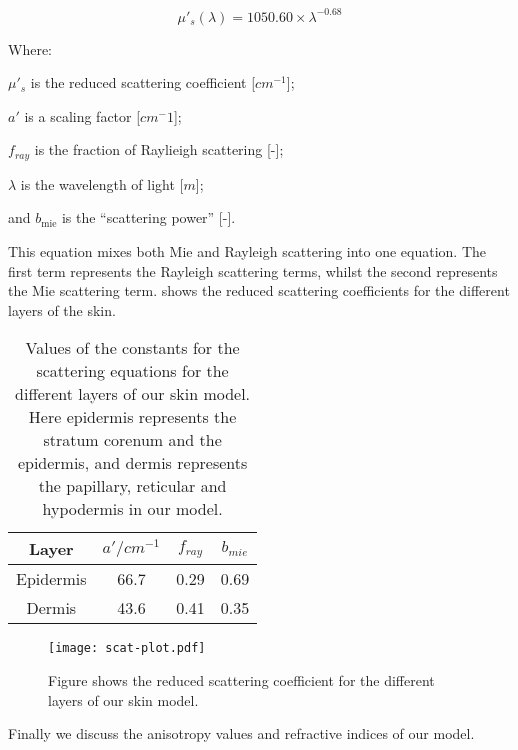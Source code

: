 \begin{equation}
\mu'_s(\lambda)=1050.60\times\lambda^{-0.68}
\label{eqn:hyposcat}
\end{equation}


\noindent Where:

	$\mu'_s$ is the reduced scattering coefficient [$cm^{-1}$];

	$a'$ is a scaling factor [$cm^-1$];

	$f_{ray}$ is the fraction of Raylieigh scattering [-];

	$\lambda$ is the wavelength of light [$m$];

	and $b_{\text{mie}}$ is the ``scattering power'' [-].

\medskip

This equation mixes both Mie and Rayleigh scattering into one equation.
The first term represents the Rayleigh scattering terms, whilst the second represents the Mie scattering term.
 shows the reduced scattering coefficients for the different layers of the skin.

\begin{table}[!htpb]
  \centering

  \begin{tabular}{|c|c|c|c|}
  \hline

  Layer & $a'/cm^{-1}$ & $f_{ray}$ & $b_{mie}$ \\
  \hline
   Epidermis         & 66.7 & 0.29 & 0.69 \\
   Dermis  & 43.6 & 0.41 & 0.35 \\

  \hline
  \end{tabular}
  \caption{Values of the constants for the scattering equations for the different layers of our skin model. Here epidermis represents the stratum corenum and the epidermis, and dermis represents the papillary, reticular and hypodermis in our model.}
  \label{tab:valscat}

\end{table}

\begin{figure}[!htpb]
	\centering
	\texttt{[image: scat-plot.pdf]}
	\caption{Figure shows the reduced scattering coefficient for the different layers of our skin model.}
	\label{fig:scatplot}
\end{figure}

\FloatBarrier

Finally we discuss the anisotropy values and refractive indices of our model.

